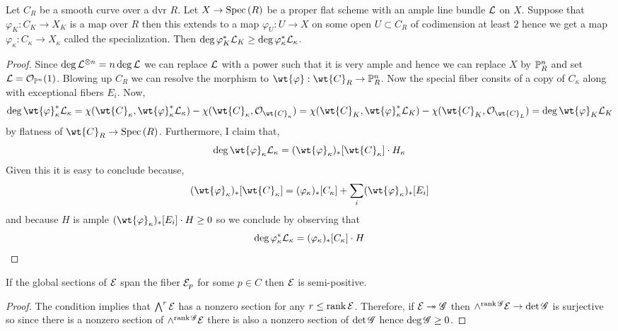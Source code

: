 \documentclass[12pt]{article}
\begin{document}
\begin{lemma}
Let $C_R$ be a smooth curve over a dvr $R$. Let $X \to \Spec{R}$ be a proper flat scheme with an ample line bundle $\L$ on $X$. Suppose that $\varphi_K : C_K \to X_K$ is a map over $R$ then this extends to a map $\varphi_U  : U \to X$ on some open $U \subset C_R$ of codimension at least $2$ hence we get a map $\varphi_\kappa : C_\kappa \to X_\kappa$ called the specialization. Then $\deg{\varphi_K^* \L_K} \ge \deg{\varphi_\kappa^* \L_\kappa}$.
\end{lemma}

\begin{proof}
Since $\deg{\L^{\ot n}} = n \deg{\L}$ we can replace $\L$ with a power such that it is very ample and hence we can replace $X$ by $\P^n_R$ and set $\L = \struct{\P^n}(1)$. Blowing up $C_R$ we can resolve the morphism to $\wt{\varphi} : \wt{C}_R \to \P_R^n$. Now the special fiber consits of a copy of $C_\kappa$ along with exceptional fibers $E_i$. Now,
\[ \deg{\wt{\varphi}_\kappa^* \L_\kappa} = \chi(\wt{C}_\kappa, \wt{\varphi}_\kappa^* \L_\kappa) - \chi(\wt{C}_\kappa, \struct{\wt{C}_\kappa}) = \chi(\wt{C}_K, \wt{\varphi}_\kappa^* \L_K) - \chi(\wt{C}_K, \struct{\wt{C}_L}) = \deg{\wt{\varphi}_K \L_K} \]
by flatness of $\wt{C}_R \to \Spec{R}$. Furthermore, I claim that,
\[ \deg{\wt{\varphi}_\kappa \L_\kappa} = (\wt{\varphi}_\kappa)_* [\wt{C}_\kappa] \cdot H_\kappa \]
Given this it is easy to conclude because,
\[ (\wt{\varphi}_\kappa)_* [\wt{C}_\kappa] = (\varphi_\kappa)_* [C_\kappa] + \sum_i (\wt{\varphi}_\kappa)_* [E_i] \]
and because $H$ is ample $(\wt{\varphi}_\kappa)_* [E_i] \cdot H \ge 0$ so we conclude by observing that 
\[ \deg{\varphi_\kappa^* \L_\kappa} = (\varphi_\kappa)_* [C_\kappa] \cdot H \] 
\end{proof}

\begin{lemma} \label{lemma:sections_imply_semipositive}
If the global sections of $\E$ span the fiber $\E_p$ for some $p \in C$ then $\E$ is semi-positive.
\end{lemma}

\begin{proof}
The condition implies that $\bigwedge^r \E$ has a nonzero section for any $r \le \rank{\E}$. Therefore, if $\E \onto \G$ then $\wedge^{\rank{\G}} \E \to \det{\G}$ is surjective so since there is a nonzero section of $\wedge^{\rank{\G}}{\E}$ there is also a nonzero section of $\det{\G}$ hence $\deg{\G} \ge 0$.
\end{proof}
\end{document}
